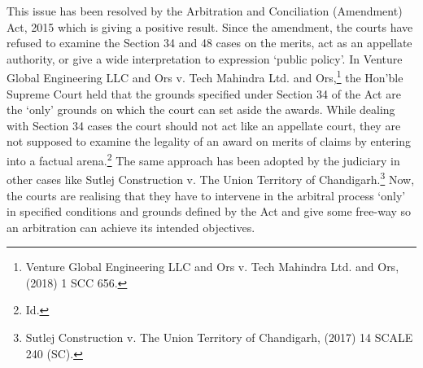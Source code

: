 \begin{multicols}{2}
\noi
This issue has been resolved by the Arbitration and Conciliation (Amendment) Act, 2015
which is giving a positive result. Since the amendment, the courts have refused to examine the
Section 34 and 48 cases on the merits, act as an appellate authority, or give a wide
interpretation to expression ‘public policy’. In Venture Global Engineering LLC and Ors v.
Tech Mahindra Ltd. and Ors,\footnote{Venture Global Engineering LLC and Ors v. Tech Mahindra Ltd. and Ors, (2018) 1 SCC 656.} the Hon’ble Supreme Court held that the grounds specified
under Section 34 of the Act are the ‘only’ grounds on which the court can set aside the awards.
While dealing with Section 34 cases the court should not act like an appellate court, they are
not supposed to examine the legality of an award on merits of claims by entering into a factual
arena.\footnote{Id.} The same approach has been adopted by the judiciary in other cases like Sutlej
Construction v. The Union Territory of Chandigarh.\footnote{Sutlej Construction v. The Union Territory of Chandigarh, (2017) 14 SCALE 240 (SC).} Now, the courts are realising that they
have to intervene in the arbitral process ‘only’ in specified conditions and grounds defined by
the Act and give some free-way so an arbitration can achieve its intended objectives.
\end{multicols}
